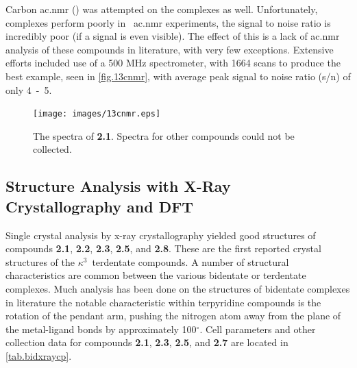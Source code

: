 Carbon \gls{ac.nmr} () was attempted on the complexes as well. Unfortunately,  complexes perform poorly in ~\gls{ac.nmr} experiments, the signal to noise ratio is incredibly poor (if a signal is even visible). The effect of this is a lack of  \gls{ac.nmr} analysis of these compounds in literature, with very few exceptions\autocite{morimoto2013}. Extensive efforts included use of a 500 MHz spectrometer, with 1664 scans to produce the best example, seen in \autoref{fig.13cnmr}, with average peak signal to noise ratio (s/n) of only 4~-~5.

\begin{figure}[!htb]
 \begin{center}
  \texttt{[image: images/13cnmr.eps]}
 \end{center}
\caption[The   spectra of \textbf{2.1}.]{The   spectra of \textbf{2.1}. Spectra for other compounds could not be collected.}
\label{fig.13cnmr}
\end{figure} 

\FloatBarrier

\subsection{Structure Analysis with X-Ray Crystallography and DFT}\label{ss.xray}

Single crystal analysis by x-ray crystallography yielded good structures of compounds \textbf{2.1}, \textbf{2.2}, \textbf{2.3}, \textbf{2.5}, and \textbf{2.8}. These are the first reported crystal structures of the $\kappa^3$~terdentate  compounds. A number of structural characteristics are common between the various bidentate or terdentate complexes. Much analysis has been done on the structures of bidentate complexes in literature\autocite{anderson1990, civitello1993, kurz2006} the notable characteristic within terpyridine compounds is the rotation of the pendant arm, pushing the nitrogen atom away from the plane of the metal-ligand bonds by approximately 100$^\circ$. Cell parameters and other collection data for compounds \textbf{2.1}, \textbf{2.3}, \textbf{2.5}, and \textbf{2.7} are located in \autoref{tab.bidxraycp}.



